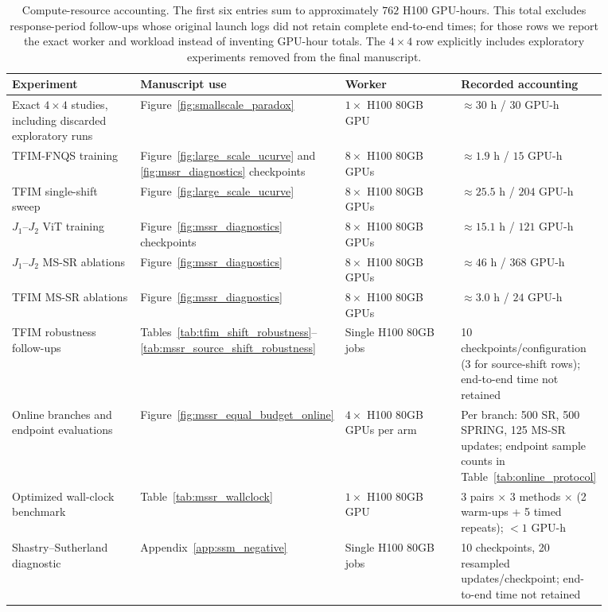 \begin{table}[h]
\centering
\scriptsize
\begin{tabular}{p{0.22\linewidth}p{0.23\linewidth}p{0.20\linewidth}p{0.22\linewidth}}
\toprule
Experiment & Manuscript use & Worker & Recorded accounting \\
\midrule
Exact $4\times4$ studies, including discarded exploratory runs &
 Figure~\ref{fig:smallscale_paradox} &
\(1\times\) H100 80GB GPU &
\(\approx30\) h / \(30\) GPU-h \\
\midrule
TFIM-FNQS training &
Figure~\ref{fig:large_scale_ucurve} and \ref{fig:mssr_diagnostics} checkpoints &
\(8\times\) H100 80GB GPUs &
\(\approx1.9\) h / \(15\) GPU-h \\
\midrule
TFIM single-shift sweep &
Figure~\ref{fig:large_scale_ucurve} &
\(8\times\) H100 80GB GPUs &
\(\approx25.5\) h / \(204\) GPU-h \\
\midrule
\(J_1\)--\(J_2\) ViT training  &
Figure~\ref{fig:mssr_diagnostics} checkpoints&
\(8\times\) H100 80GB GPUs &
\(\approx15.1\) h / \(121\) GPU-h \\
\midrule
\(J_1\)--\(J_2\) MS-SR ablations &
Figure~\ref{fig:mssr_diagnostics} &
\(8\times\) H100 80GB GPUs &
\(\approx46\) h / \(368\) GPU-h \\
\midrule
TFIM MS-SR ablations &
Figure~\ref{fig:mssr_diagnostics} &
\(8\times\) H100 80GB GPUs &
\(\approx3.0\) h / \(24\) GPU-h \\
\midrule
TFIM robustness follow-ups &
Tables~\ref{tab:tfim_shift_robustness}--\ref{tab:mssr_source_shift_robustness} &
Single H100 80GB jobs &
10 checkpoints/configuration (3 for source-shift rows); end-to-end time not retained \\
\midrule
Online branches and endpoint evaluations &
Figure~\ref{fig:mssr_equal_budget_online} &
$4\times$ H100 80GB GPUs per arm &
Per branch: 500 SR, 500 SPRING, 125 MS-SR updates; endpoint sample counts in Table~\ref{tab:online_protocol} \\
\midrule
Optimized wall-clock benchmark &
Table~\ref{tab:mssr_wallclock} &
$1\times$ H100 80GB GPU &
3 pairs $\times$ 3 methods $\times$ (2 warm-ups + 5 timed repeats); $<1$ GPU-h \\
\midrule
Shastry--Sutherland diagnostic &
Appendix~\ref{app:ssm_negative} &
Single H100 80GB jobs &
10 checkpoints, 20 resampled updates/checkpoint; end-to-end time not retained \\
\bottomrule
\end{tabular}
\caption{Compute-resource accounting. The first six entries sum to
approximately $762$ H100 GPU-hours. This total excludes response-period
follow-ups whose original launch logs did not retain complete end-to-end
times; for those rows we report the exact worker and workload instead of
inventing GPU-hour totals. The $4\times4$ row explicitly includes exploratory
experiments removed from the final manuscript.}
\label{tab:compute_resources}
\end{table}
